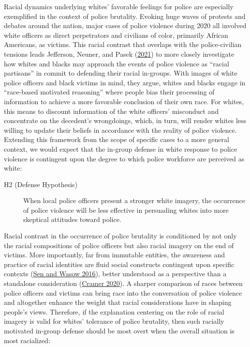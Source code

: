 \documentclass[
  12pt,
]{article}
\begin{document}
Racial dynamics underlying whites' favorable feelings for police are
especially exemplified in the context of police brutality. Evoking huge
waves of protests and debates around the nation, major cases of police
violence during 2020 all involved white officers as direct perpetrators
and civilians of color, primarily African Americans, as victims. This
racial contrast that overlaps with the police-civilian tensions leads
Jefferson, Neuner, and Pasek
(\protect\hyperlink{ref-jefferson2021}{2021}) to more closely
investigate how whites and blacks may approach the events of police
violence as ``racial partisans'' in commit to defending their racial
in-groups. With images of white police officers and black victims in
mind, they argue, whites and blacks engage in ``race-based motivated
reasoning'' where people bias their processing of information to achieve
a more favorable conclusion of their own race. For whites, this means to
discount information of the white officers' misconduct and concentrate
on the decedent's wrongdoings, which, in turn, will render whites less
willing to update their beliefs in accordance with the reality of police
violence. Extending this framework from the scope of specific cases to a
more general context, we would expect that the in-group defense in white
response to police violence is contingent upon the degree to which
police workforce are perceived as white:

\begin{description}
\item[H2 (Defense Hypothesis)]
When local police officers present a stronger white imagery, the
occurrence of police violence will be less effective in persuading
whites into more skeptical attitudes toward police.
\end{description}

Racial contrast in the occurrence of police brutality is conditioned by
not only the racial compositions of police officers but also racial
imagery on the end of victims. More importantly, far from immutable
entities, the awareness and practice of racial identities are fluid
social constructs contingent upon specific contexts
(\protect\hyperlink{ref-sen2016}{Sen and Wasow 2016}), better understood
as a perspective than a standalone consideration
(\protect\hyperlink{ref-cramer2020}{Cramer 2020}). A sharper comparison
of races between police officers and victims can bring race into the
conversation of police violence and altogether enhance the weight that
racial considerations have in shaping people's views. Therefore, if the
explanation centering on the role of racial imagery is valid for whites'
tolerance of police brutality, then such racially motivated in-group
defense should be most overt when the overall situation is most
racialized:
\end{document}
